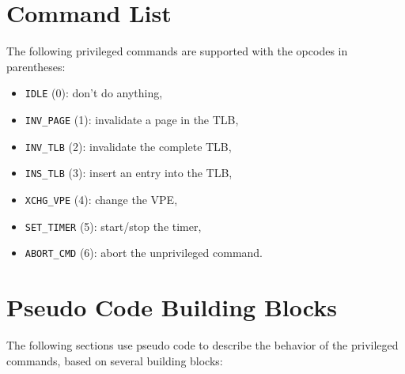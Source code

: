 \section{Command List}

The following privileged commands are supported with the opcodes in parentheses:

\begin{itemize}
  \item \texttt{IDLE} (0):  don't do anything, \extend{}
  \item \texttt{INV\_PAGE} (1): invalidate a page in the TLB, 
  \item \texttt{INV\_TLB} (2): invalidate the complete TLB,
  \item \texttt{INS\_TLB} (3): insert an entry into the TLB, \extend{}
  \item \texttt{XCHG\_VPE} (4): change the VPE, 
  \item \texttt{SET\_TIMER} (5): start/stop the timer,
  \item \texttt{ABORT\_CMD} (6): abort the unprivileged command. \extend{}
\end{itemize}

\section{Pseudo Code Building Blocks}

The following sections use pseudo code to describe the behavior of the privileged commands, based on
several building blocks:

